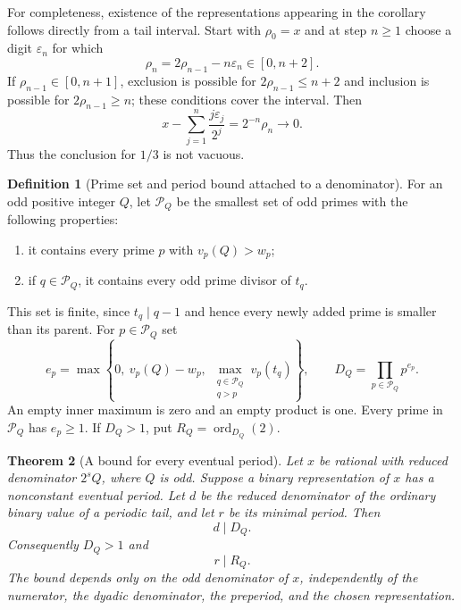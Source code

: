 \documentclass[11pt]{article}
\newtheorem{theorem}{Theorem}[section]
\theoremstyle{definition}
\newtheorem{definition}[theorem]{Definition}
\theoremstyle{remark}
\begin{document}
For completeness, existence of the representations appearing in the corollary follows directly from a tail interval. Start with $\rho_0=x$ and at step $n\ge1$ choose a digit $\varepsilon_n$ for which
\[
 \rho_n=2\rho_{n-1}-n\varepsilon_n\in[0,n+2].
\]
If $\rho_{n-1}\in[0,n+1]$, exclusion is possible for $2\rho_{n-1}\le n+2$ and inclusion is possible for $2\rho_{n-1}\ge n$; these conditions cover the interval. Then
\[
 x-\sum_{j=1}^n\frac{j\varepsilon_j}{2^j}
 =2^{-n}\rho_n\longrightarrow0.
\]
Thus the conclusion for $1/3$ is not vacuous.

\begin{definition}[Prime set and period bound attached to a denominator]
\label{def:denominator-period-bound}
For an odd positive integer $Q$, let $\mathcal P_Q$ be the smallest set of odd primes with the following properties:
\begin{enumerate}
\item it contains every prime $p$ with $v_p(Q)>w_p$;
\item if $q\in\mathcal P_Q$, it contains every odd prime divisor of $t_q$.
\end{enumerate}
This set is finite, since $t_q\mid q-1$ and hence every newly added prime is smaller than its parent. For $p\in\mathcal P_Q$ set
\[
 e_p=\max\left\{0,\ v_p(Q)-w_p,\
                 \max_{\substack{q\in\mathcal P_Q\\q>p}}v_p(t_q)\right\},
 \qquad D_Q=\prod_{p\in\mathcal P_Q}p^{e_p}.
\]
An empty inner maximum is zero and an empty product is one. Every prime in $\mathcal P_Q$ has $e_p\ge1$. If $D_Q>1$, put $R_Q=\operatorname{ord}_{D_Q}(2)$.
\end{definition}

\begin{theorem}[A bound for every eventual period]\label{thm:denominator-period-bound}
Let $x$ be rational with reduced denominator $2^sQ$, where $Q$ is odd. Suppose a binary representation of $x$ has a nonconstant eventual period. Let $d$ be the reduced denominator of the ordinary binary value of a periodic tail, and let $r$ be its minimal period. Then
\[
 d\mid D_Q.
\]
Consequently $D_Q>1$ and
\[
 r\mid R_Q.
\]
The bound depends only on the odd denominator of $x$, independently of the numerator, the dyadic denominator, the preperiod, and the chosen representation.
\end{theorem}
\end{document}
